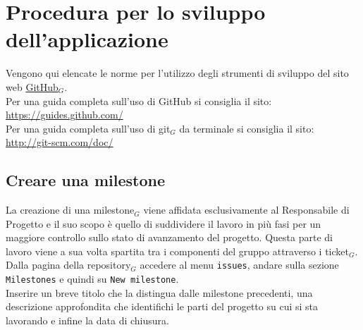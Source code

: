 \section{Procedura per lo sviluppo dell'applicazione}

Vengono qui elencate le norme per l'utilizzo degli strumenti di sviluppo del sito web \href{http://www.github.com/}{GitHub}$_{G}$. \\
Per una guida completa sull'uso di GitHub si consiglia il sito:\\
\url{https://guides.github.com/}\\
Per una guida completa sull'uso di git$_{G}$ da terminale si consiglia il sito:\\
\url{http://git-scm.com/doc/}\\

\subsection{Creare una milestone}
La creazione di una milestone$_{G}$ viene affidata esclusivamente al Responsabile di Progetto e il suo scopo è quello di suddividere il lavoro in più fasi per un maggiore controllo sullo stato di avanzamento del progetto. Questa parte di lavoro viene a sua volta spartita tra i componenti del gruppo attraverso i ticket$_{G}$. \\
    Dalla pagina della repository$_{G}$ accedere al menu \texttt{issues}, andare sulla sezione \texttt{Milestones} e quindi su \texttt{New milestone}.\\
    Inserire un breve titolo che la distingua dalle milestone precedenti, una descrizione approfondita che identifichi le parti del progetto su cui si sta lavorando e infine la data di chiusura.

